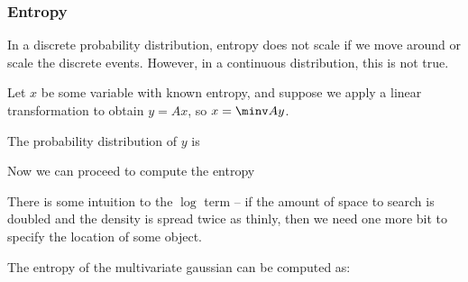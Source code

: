 \documentclass[12pt]{article}
\begin{document}
\subsubsection{Entropy}


In a discrete probability distribution, entropy does not scale if we move around or scale the discrete events. However, in a continuous distribution, this is not true.

Let $x$ be some variable with known entropy, and suppose we apply a linear transformation to obtain $y = Ax$, so $x = \minv A y$.

The probability distribution of $y$ is

Now we can proceed to compute the entropy

There is some intuition to the $\log$ term -- if the amount of space to search is doubled and the density is spread twice as thinly, then we need one more bit to specify the location of some object.

The entropy of the multivariate gaussian can be computed as:
\end{document}
